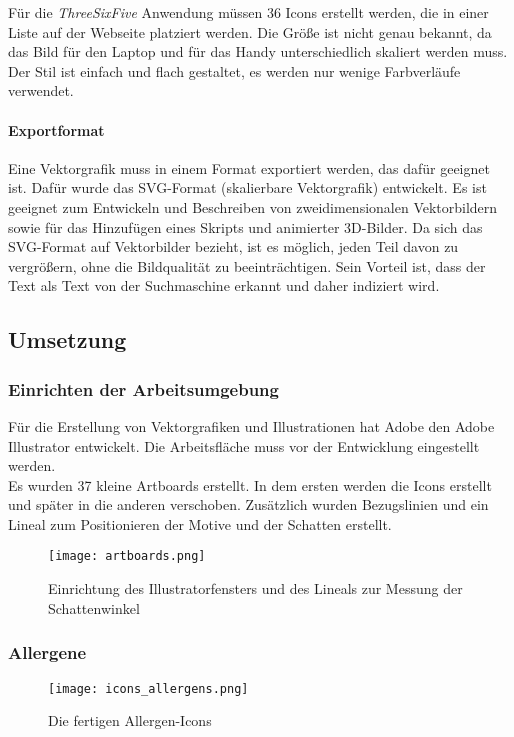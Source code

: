 Für die \textit{ThreeSixFive} Anwendung müssen 36 Icons erstellt werden, die in einer Liste auf der Webseite platziert werden. Die Größe ist nicht genau bekannt, da das Bild für den Laptop und für das Handy unterschiedlich skaliert werden muss. Der Stil ist einfach und flach gestaltet, es werden nur wenige Farbverläufe verwendet. 

\paragraph{Exportformat}
Eine Vektorgrafik muss in einem Format exportiert werden, das dafür geeignet ist.  Dafür wurde das SVG-Format (skalierbare Vektorgrafik) entwickelt. Es ist geeignet zum Entwickeln und Beschreiben von zweidimensionalen Vektorbildern sowie für das Hinzufügen eines Skripts und animierter 3D-Bilder. Da sich das SVG-Format auf Vektorbilder bezieht, ist es möglich, jeden Teil davon zu vergrößern, ohne die Bildqualität zu beeinträchtigen. Sein Vorteil ist, dass der Text als Text von der Suchmaschine erkannt und daher indiziert wird.

\subsection{Umsetzung}

\subsubsection{Einrichten der Arbeitsumgebung}

Für die Erstellung von Vektorgrafiken und Illustrationen hat Adobe den Adobe Illustrator entwickelt. Die Arbeitsfläche muss vor der Entwicklung eingestellt werden.\\
Es wurden 37 kleine Artboards erstellt. In dem ersten werden die Icons erstellt und später in die anderen verschoben. Zusätzlich wurden Bezugslinien und ein Lineal zum Positionieren der Motive und der Schatten erstellt.\\
\begin{figure}[H] \centering \texttt{[image: artboards.png]} \caption{Einrichtung des Illustratorfensters und des Lineals zur Messung der Schattenwinkel} \end{figure}

\subsubsection{Allergene}

\begin{figure}[H] \centering \texttt{[image: icons\_allergens.png]} \caption{Die fertigen Allergen-Icons} \end{figure}

